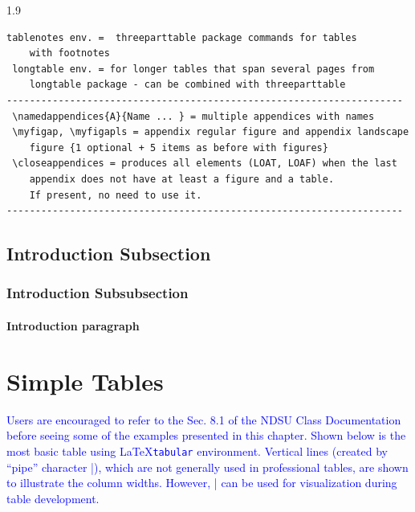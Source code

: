 \documentclass[phd]{ndsu-thesis-2022}
\newcommand\myspacing{1.9}      %
\newcommand\italk[1]{\textcolor{blue}{#1}}  %
\newcommand\lx{\LaTeX\xspace}
\begin{document}
\begin{spacing}{\myspacing}
\begin{lstlisting}[basicstyle=\ttfamily\footnotesize\color{blue}]
 tablenotes env. =  threeparttable package commands for tables 
 	with footnotes 
 longtable env. = for longer tables that span several pages from 
 	longtable package - can be combined with threeparttable 
---------------------------------------------------------------------
 \namedappendices{A}{Name ... } = multiple appendices with names 
 \myfigap, \myfigapls = appendix regular figure and appendix landscape 
 	figure {1 optional + 5 items as before with figures}
 \closeappendices = produces all elements (LOAT, LOAF) when the last 
 	appendix does not have at least a figure and a table. 
	If present, no need to use it.
---------------------------------------------------------------------
\end{lstlisting}

\subsection{Introduction Subsection}
\kant[4]

\subsubsection{Introduction Subsubsection}
\kant[6]

\paragraph{Introduction paragraph}
\kant[8]



\section{Simple Tables}

\italk{Users are encouraged to refer to the Sec. 8.1 of the NDSU Class Documentation before seeing some of the examples presented in this chapter. Shown below is the most basic table using \lx \texttt{tabular} environment. Vertical lines (created by ``pipe'' character |), which are not generally used in professional tables, are shown to illustrate the column widths. However, | can be used for visualization during table development.}


\end{spacing}
\end{document}
